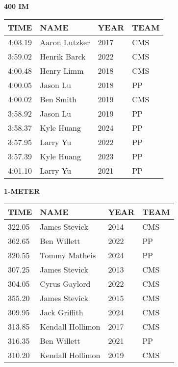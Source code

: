 \vspace{0.4cm}

\begin{center}
\begin{minipage}[t]{0.7\textwidth}
\centering
\textbf{400 IM}\\[0.05cm]
\begin{tabular}{@{}p{1.8cm}p{2.8cm}p{1.2cm}p{1.4cm}@{}}
\hline
\textbf{TIME} & \textbf{NAME} & \textbf{YEAR} & \textbf{TEAM} \\
\hline
4:03.19 & Aaron Lutzker & 2017 & CMS \\
3:59.02 & Henrik Barck & 2022 & CMS \\
4:00.48 & Henry Limm & 2018 & CMS \\
4:00.05 & Jason Lu & 2018 & PP \\
4:00.02 & Ben Smith & 2019 & CMS \\
3:58.92 & Jason Lu & 2019 & PP \\
3:58.37 & Kyle Huang & 2024 & PP \\
3:57.95 & Larry Yu & 2022 & PP \\
3:57.39 & Kyle Huang & 2023 & PP \\
4:01.10 & Larry Yu & 2021 & PP \\
\hline
\end{tabular}
\end{minipage}
\end{center}

\vspace{0.4cm}

\begin{center}
\begin{minipage}[t]{0.7\textwidth}
\centering
\textbf{1-METER}\\[0.05cm]
\begin{tabular}{@{}p{1.8cm}p{2.8cm}p{1.2cm}p{1.4cm}@{}}
\hline
\textbf{TIME} & \textbf{NAME} & \textbf{YEAR} & \textbf{TEAM} \\
\hline
322.05 & James Stevick & 2014 & CMS \\
362.65 & Ben Willett & 2022 & PP \\
320.55 & Tommy Matheis & 2024 & PP \\
307.25 & James Stevick & 2013 & CMS \\
304.05 & Cyrus Gaylord & 2022 & CMS \\
355.20 & James Stevick & 2015 & CMS \\
309.95 & Jack Griffith & 2024 & CMS \\
313.85 & Kendall Hollimon & 2017 & CMS \\
316.35 & Ben Willett & 2021 & PP \\
310.20 & Kendall Hollimon & 2019 & CMS \\
\hline
\end{tabular}
\end{minipage}
\end{center}

